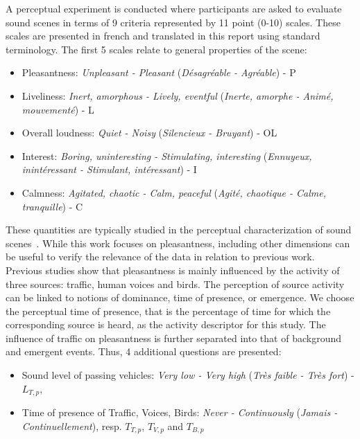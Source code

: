 \documentclass[11pt,a4paper]{article}
\begin{document}
A perceptual experiment is conducted where participants are asked to evaluate sound scenes in terms of 9 criteria represented by 11 point (0-10) scales. These scales are presented in french and translated in this report using standard terminology. The first 5 scales relate to general properties of the scene:
\begin{itemize}
\item Pleasantness: \textit{Unpleasant - Pleasant} (\textit{D\'esagr\'eable - Agr\'eable}) - P
\item Liveliness: \textit{Inert, amorphous - Lively, eventful} (\textit{Inerte, amorphe - Anim\'e, mouvement\'e}) - L
\item Overall loudness: \textit{Quiet - Noisy} (\textit{Silencieux - Bruyant}) - OL
\item Interest: \textit{Boring, uninteresting - Stimulating, interesting} (\textit{Ennuyeux, inint\'eressant - Stimulant, int\'eressant}) - I
\item Calmness: \textit{Agitated, chaotic - Calm, peaceful} (\textit{Agit\'e, chaotique - Calme, tranquille}) - C
\end{itemize}


These quantities are typically studied in the perceptual characterization of sound scenes~\cite{axelsson2010, aumond2017, nilsson2007}. While this work focuses on pleasantness, including other dimensions can be useful to verify the relevance of the data in relation to previous work.\\

Previous studies show that pleasantness is mainly influenced by the activity of three sources: traffic, human voices and birds. The perception of source activity can be linked to notions of dominance, time of presence, or emergence. We choose the perceptual time of presence, that is the percentage of time for which the corresponding source is heard, as the activity descriptor for this study. The influence of traffic on pleasantness is further separated into that of background and emergent events. Thus, 4 additional questions are presented:
\begin{itemize}
\item Sound level of passing vehicles: \textit{Very low - Very high} (\textit{Tr\`es faible - Tr\`es fort}) - $L_{T, p}$,
\item Time of presence of Traffic, Voices, Birds: \textit{Never - Continuously} (\textit{Jamais - Continuellement}), resp. $T_{T, p}$, $T_{V, p}$ and $T_{B, p}$
\end{itemize}
\end{document}
